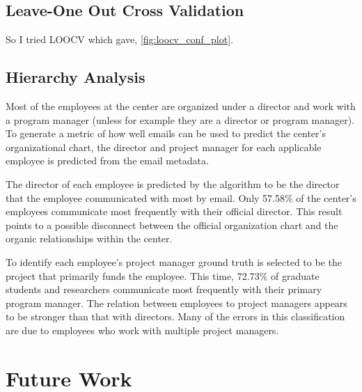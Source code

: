 \documentclass[12pt]{report}
\begin{document}
\section{Leave-One Out Cross Validation}
So I tried LOOCV which gave, \ref{fig:loocv_conf_plot}.

\section{Hierarchy Analysis}
Most of the employees at the center are organized under a director and work with a program manager (unless for example they are a director or program manager).
To generate a metric of how well emails can be used to predict the center's organizational chart, the director and project manager for each applicable employee is predicted from the email metadata. 

The director of each employee is predicted by the algorithm to be the director that the employee communicated with most by email.
Only 57.58\% of the center's employees communicate most frequently with their official director.
This result points to a possible disconnect between the official organization chart and the organic relationships within the center.

To identify each employee's project manager ground truth is selected to be the project that primarily funds the employee.
This time, 72.73\% of graduate students and researchers communicate most frequently with their primary program manager.
The relation between employees to project managers appears to be stronger than that with directors.
Many of the errors in this classification are due to employees who work with multiple project managers.  

\chapter{Future Work} \label{FutureWork}
\end{document}
